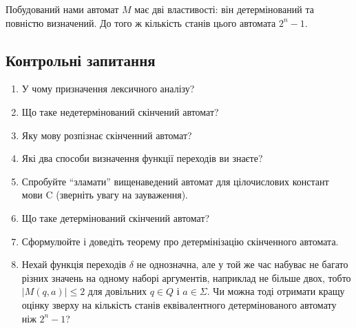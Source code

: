 Побудований нами автомат $M$ має дві властивості: він детермінований та повністю визначений. До того ж кількість станів цього автомата $2^n - 1$.

\subsection{Контрольні запитання}

\begin{enumerate}
	\item У чому призначення лексичного аналізу? %
	\item Що таке недетермінований скінчений автомат? %
	\item Яку мову розпізнає скінченний автомат? %
	\item Які два способи визначення функції переходів ви знаєте? %
	\item Спробуйте ``зламати'' вищенаведений автомат для цілочислових \allowbreak констант мови C (зверніть увагу на зауваження). %
	\item Що таке детермінований скінчений автомат? %
	\item Сформулюйте і доведіть теорему про детермінізацію скінченного автомата.
	\item Нехай функція переходів $\delta$ не однозначна, але у той же час набуває не багато різних значень на одному наборі аргументів, наприклад не більше двох, тобто $|M(q, a)| \le 2$ для довільних $q \in Q$ і $a \in \Sigma$. Чи можна тоді отримати кращу оцінку зверху на кількість станів еквівалентного детермінованого автомату ніж $2^n - 1$?
\end{enumerate}
